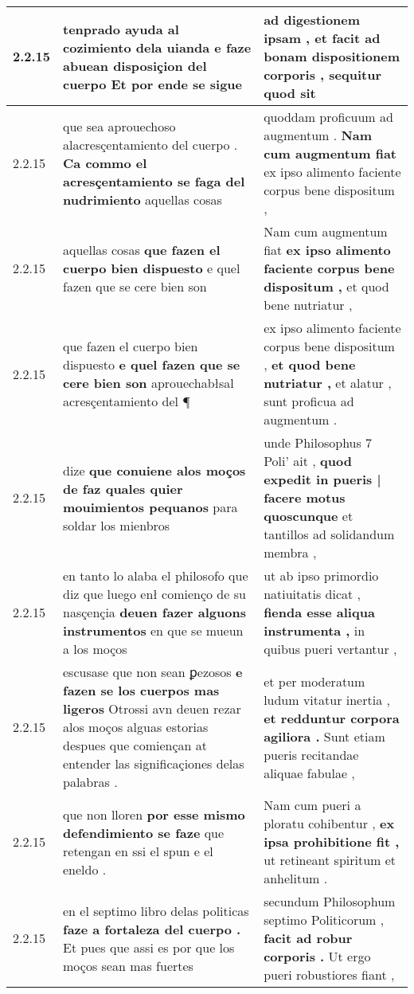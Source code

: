 \begin{tabular}{|p{1cm}|p{6.5cm}|p{6.5cm}|}
2.2.15 & tenprado ayuda al cozimiento dela uianda \textbf{ e faze abuean disposiçion del cuerpo } Et por ende se sigue & ad digestionem ipsam , \textbf{ et facit ad bonam dispositionem corporis , } sequitur quod sit \\\hline
2.2.15 & que sea aprouechoso alacresçentamiento del cuerpo . \textbf{ Ca commo el acresçentamiento se faga del nudrimiento } aquellas cosas & quoddam proficuum ad augmentum . \textbf{ Nam cum augmentum fiat } ex ipso alimento faciente corpus bene dispositum , \\\hline
2.2.15 & aquellas cosas \textbf{ que fazen el cuerpo bien dispuesto } e quel fazen que se cere bien son & Nam cum augmentum fiat \textbf{ ex ipso alimento faciente corpus bene dispositum , } et quod bene nutriatur , \\\hline
2.2.15 & que fazen el cuerpo bien dispuesto \textbf{ e quel fazen que se cere bien son } aprouechabłsal acresçentamiento del ¶ & ex ipso alimento faciente corpus bene dispositum , \textbf{ et quod bene nutriatur , } et alatur , sunt proficua ad augmentum . \\\hline
2.2.15 & dize \textbf{ que conuiene alos moços de faz quales quier mouimientos pequanos } para soldar los mienbros & unde Philosophus 7 Poli’ ait , \textbf{ quod expedit in pueris | facere motus quoscunque } et tantillos ad solidandum membra , \\\hline
2.2.15 & en tanto lo alaba el philosofo que diz que luego enł comienço de su nasçençia \textbf{ deuen fazer alguons instrumentos } en que se mueun a los moços & ut ab ipso primordio natiuitatis dicat , \textbf{ fienda esse aliqua instrumenta , } in quibus pueri vertantur , \\\hline
2.2.15 & escusase que non sean ꝑezosos \textbf{ e fazen se los cuerpos mas ligeros } Otrossi avn deuen rezar alos moços alguas estorias despues que comiençan at entender las significaçiones delas palabras . & et per moderatum ludum vitatur inertia , \textbf{ et redduntur corpora agiliora . } Sunt etiam pueris recitandae aliquae fabulae , \\\hline
2.2.15 & que non lloren \textbf{ por esse mismo defendimiento se faze } que retengan en ssi el spun e el eneldo . & Nam cum pueri a ploratu cohibentur , \textbf{ ex ipsa prohibitione fit , } ut retineant spiritum et anhelitum . \\\hline
2.2.15 & en el septimo libro delas politicas \textbf{ faze a fortaleza del cuerpo . } Et pues que assi es por que los moços sean mas fuertes & secundum Philosophum septimo Politicorum , \textbf{ facit ad robur corporis . } Ut ergo pueri robustiores fiant , \\\hline

\end{tabular}
